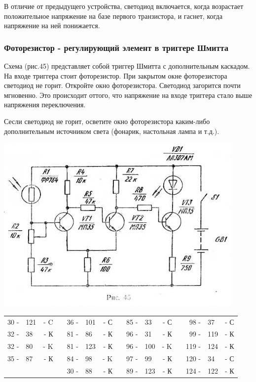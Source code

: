 \documentclass[12pt]{article}
\begin{document}
\hrulefill

В отличие от предыдущего устройства, светодиод включается, когда возрастает положительное напряжение на базе первого транзистора, и гаснет, когда напряжение на ней понижается.

\subsubsection{Фоторезистор - регулирующий элемент в триггере Шмитта}

Схема (рис.45) представляет собой триггер Шмитта с дополнительным каскадом. На входе триггера стоит фоторезистор. При закрытом окне фоторезистора светодиод не горит. Откройте окно фоторезистора. Светодиод загорится почти мгновенно. Это происходит оттого, что напряжение на входе триггера стало выше напряжения переключения.

Сесли светодиод не горит, осветите окно фоторезистора каким-либо дополнительным источником света (фонарик, настольная лампа и т.д.).

\newpage
\hspace*{0.7cm}\includegraphics[scale=0.99, angle=0]{ekon3_046_1}

\hrulefill

\begin{tabular}{r l r p{0.5cm} r l r p{0.5cm} r l r p{0.5cm} r l r}
30 - & 121 & - C &   & 36 - & 101 & - С &   & 85 - &  33 & - С &   &  98 - &  37 & - С\\
32 - &  38 & - К &   & 81 - &  86 & - К &   & 96 - &  31 & - К &   &  99 - & 119 & - К\\
32 - &  80 & - K &   & 81 - & 123 & - К &   & 96 - & 100 & - K &   & 119 - & 124 & - К\\
35 - &  87 & - К &   & 84 - &  98 & - K &   & 97 - &  99 & - К &   & 120 - &  34 & - С\\
     &     &     &   & 30 - &  88 & - К &   & 89 - & 123 & - К &   & 124 - & 122 & - К\\
\end{tabular}
\end{document}
